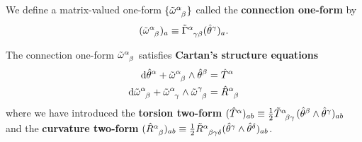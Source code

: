 \documentclass[10pt]{article}
\begin{document}
\begin{definition}
    We define a matrix-valued one-form $\{\tensor{\tilde{\omega}}{^\alpha_\beta}\}$ called the \textbf{connection one-form} by\snm
    \begin{align}
        (\tensor{\tilde{\omega}}{^\alpha_\beta})_a\equiv\tensor{\tilde{\Gamma}}{^\alpha_\gamma_\beta}(\hat{\theta}^\gamma)_a.
    \end{align}
\end{definition}

\begin{theorem}
    The connection one-form $\tensor{\tilde{\omega}}{^\alpha_\beta}$ satisfies \textbf{Cartan's structure equations}
    \begin{align}
        \dd{\hat{\theta}^\alpha}+\tensor{\tilde{\omega}}{^\alpha_\beta}\wedge\hat{\theta}^\beta                                         & =\hat{T}^\alpha\label{cartan1}                  \\
        \dd{\tensor{\tilde{\omega}}{^\alpha_\beta}}+\tensor{\tilde{\omega}}{^\alpha_\gamma}\wedge\tensor{\tilde{\omega}}{^\gamma_\beta} & =\tensor{\hat{R}}{^\alpha_\beta}\label{cartan2}
    \end{align}
    where we have introduced the \textbf{torsion two-form} $(\hat{T}^\alpha)_{ab}\equiv\frac{1}{2}\tensor{\tilde{T}}{^\alpha_\beta_\gamma}(\hat{\theta}^\beta\wedge\hat{\theta}^\gamma)_{ab}$ and the \textbf{curvature two-form} $(\tensor{\hat{R}}{^\alpha_\beta})_{ab}\equiv\frac{1}{2}\tensor{\tilde{R}}{^\alpha_\beta_\gamma_\delta}(\hat{\theta}^\gamma\wedge\hat{\theta}^\delta)_{ab}$.
\end{theorem}
\end{document}
